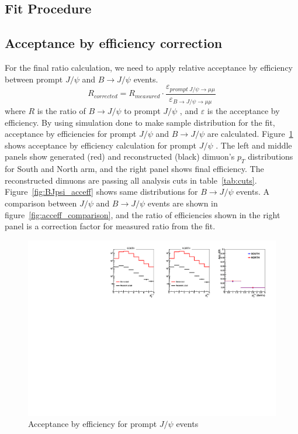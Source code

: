 \documentclass[12pt]{article}
\newcommand{\pt}{$p_{T}$ }
\newcommand{\jpsi}{$J/\psi$ }
\newcommand{\bjpsi}{${B} \to J/\psi$ }
\begin{document}
\subsection{Fit Procedure}
\label{sec:Fit}

\subsection{Acceptance by efficiency correction}
\label{sec:accbyeff}
For the final ratio calculation, we need to apply relative acceptance by efficiency between prompt \jpsi and \bjpsi events.
\begin{equation}
R_{corrected} = R_{measured}\cdot\frac{\varepsilon_{prompt~J/\psi\to\mu\mu}}{\varepsilon_{B\to J/\psi\to\mu\mu}}
\end{equation}
where $R$ is the ratio of \bjpsi to prompt \jpsi, and $\varepsilon$ is the acceptance by efficiency.
By using simulation done to make sample distribution for the fit, acceptance by efficiencies for prompt \jpsi and \bjpsi are calculated.
Figure~\ref{fig:Jpsi_acceff} shows acceptance by efficiency calculation for prompt \jpsi.
The left and middle panels show generated (red) and reconstructed (black) dimuon's \pt distributions for South and North arm, and the right panel shows final efficiency.
The reconstructed dimuons are passing all analysis cuts in table~\ref{tab:cuts}. 
Figure~\ref{fig:BJpsi_acceff} shows same distributions for \bjpsi events.
A comparison between \jpsi and \bjpsi events are shown in figure~\ref{fig:acceff_comparison}, and the ratio of efficiencies shown in the right panel is a correction factor for measured ratio from the fit.

\begin{figure}[!htb]
	\includegraphics[width=1.0\textwidth]{Figures/Run12pp510_Jpsi_acc_eff}
	\caption{Acceptance by efficiency for prompt \jpsi events}
	\label{fig:Jpsi_acceff}
\end{figure}
\end{document}
